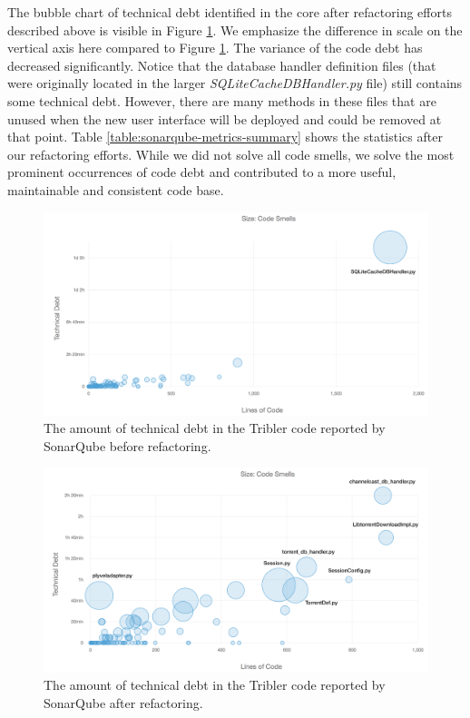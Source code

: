 The bubble chart of technical debt identified in the core after refactoring efforts described above is visible in Figure \ref{fig:technical-debt-core-before}. We emphasize the difference in scale on the vertical axis here compared to Figure \ref{fig:technical-debt-core-before}. The variance of the code debt has decreased significantly. Notice that the database handler definition files (that were originally located in the larger \emph{SQLiteCacheDBHandler.py} file) still contains some technical debt. However, there are many methods in these files that are unused when the new user interface will be deployed and could be removed at that point. Table \ref{table:sonarqube-metrics-summary} shows the statistics after our refactoring efforts. While we did not solve all code smells, we solve the most prominent occurrences of code debt and contributed to a more useful, maintainable and consistent code base.

\begin{figure}[h!]
	\centering
	\includegraphics[width=1.0\columnwidth]{images/improving_qa/technical_debt_core_before}
	\caption{The amount of technical debt in the Tribler code reported by SonarQube before refactoring.}
	\label{fig:technical-debt-core-before}
\end{figure}

\begin{figure}[h!]
	\centering
	\includegraphics[width=1.0\columnwidth]{images/improving_qa/technical_debt_core_after}
	\caption{The amount of technical debt in the Tribler code reported by SonarQube after refactoring.}
	\label{fig:technical-debt-core-after}
\end{figure}

